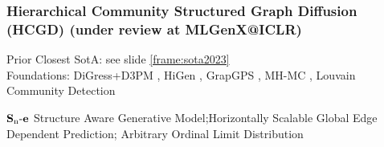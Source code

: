 \documentclass[./presentation.tex]{subfiles}
\begin{document}
\begin{frame}[t,label=hcgdfin]
  \frametitle{\textbf{H}ierarchical \textbf{C}ommunity Structured \textbf{G}raph \textbf{D}iffusion (HCGD) (under review at MLGenX@ICLR)}
  \vspace{-1cm}
  \begin{priorart}
    Prior Closest SotA: see slide \ref{frame:sota2023}\\%
    Foundations: DiGress+D3PM \citep{krawczukGGGANGeometricGraph2020,austinStructuredDenoisingDiffusion2021e}, HiGen \citep{karamiHiGenHierarchicalGraph2023a}, GrapGPS \citep{rampasekRecipeGeneralPowerful2022b}, MH-MC \citep{metropolisEquationStateCalculations1953a}, Louvain Community Detection \citep{newmanFindingEvaluatingCommunity2004,blondelFastUnfoldingCommunities2008d}
  \end{priorart}
  \begin{contributions}
    $\operatorname{\mathbf{S}_n\mathbf{-e}}$ Structure Aware Generative Model;Horizontally Scalable Global Edge Dependent Prediction; Arbitrary Ordinal Limit Distribution
  \end{contributions}
\end{frame}
\end{document}
